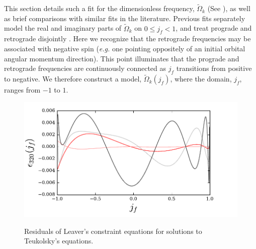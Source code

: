 \documentclass[twocolumn,prd,floatfix,preprintnumbers,a4paper,nofootinbib,superscriptaddress]{revtex4-1}
\newcommand{\CW}{\tilde{\Omega}}
\def\j{j_f}
\begin{document}
%
This section details such a fit for the dimensionless \qnm{} frequency, $\CW_{k}$ (See ), as well as brief comparisons with similar fits in the literature.
%
Previous fits separately model the real and imaginary parts of $\CW_{k}$ on $0 \leq \j{} < 1$, and treat prograde and retrograde \qnm{} disjointly \cite{Berti:2005ys}.
%
Here we recognize that the retrograde frequencies may be associated with negative \bh{} spin (\textit{e.g.} one pointing oppositely of an initial orbital angular momentum direction).
%
This point illuminates that the prograde and retrograde \qnm{} frequencies are continuously connected as $\j{}$ transitions from positive to negative.
%
We therefore construct a model, $\CW_{k}(\j{})$, where the domain, $\j{}$, ranges from $-1$ to $1$.
%


\begin{figure}[htb]
	{\hspace{0cm}\includegraphics[width=\figfactor\textwidth]{test_python_fit_equations_l3m2n0.pdf}}
	\caption{ Residuals of Leaver's constraint equations for \qnm{} solutions to Teukolsky's equations.  }
	\label{fig:lvrres}
\end{figure}
\end{document}
